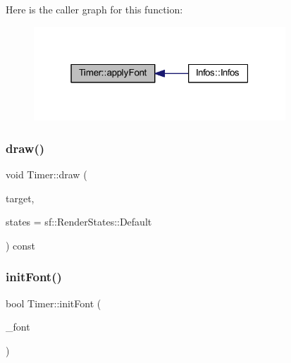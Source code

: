 Here is the caller graph for this function\+:
\nopagebreak
\begin{figure}[H]
\begin{center}
\leavevmode
\includegraphics[width=268pt]{class_timer_a735fb44ab37e1fa12679d5ab291c488d_icgraph}
\end{center}
\end{figure}
\mbox{\label{class_timer_a80c3f4ebbd84818de5531f5af3d511de}} 
\subsubsection{\texorpdfstring{draw()}{draw()}}
{\footnotesize\ttfamily void Timer\+::draw (\begin{DoxyParamCaption}\item[{sf\+::\+Render\+Target \&}]{target,  }\item[{sf\+::\+Render\+States}]{states = {\ttfamily sf\+:\+:RenderStates\+:\+:Default} }\end{DoxyParamCaption}) const\hspace{0.3cm}{\ttfamily [virtual]}}

\mbox{\label{class_timer_aac2ddf298c3916e8839e827b387e6973}} 
\subsubsection{\texorpdfstring{init\+Font()}{initFont()}}
{\footnotesize\ttfamily bool Timer\+::init\+Font (\begin{DoxyParamCaption}\item[{const sf\+::\+String \&}]{\+\_\+font }\end{DoxyParamCaption})\hspace{0.3cm}{\ttfamily [static]}}


